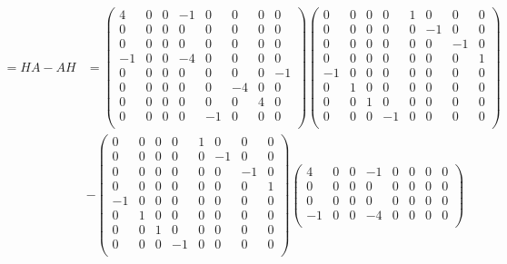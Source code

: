\begin{align*}
	[H,A] = HA-AH &=
	\begin{pmatrix}
4 & 0 & 0 & -1 & 0 & 0 & 0 & 0  \\
0 & 0 & 0 & 0 & 0 & 0 & 0 & 0  \\
0 & 0 & 0 & 0 & 0 & 0 & 0 & 0  \\
-1 & 0 & 0 & -4 & 0 & 0 & 0 & 0  \\
0 & 0 & 0 & 0 & 0 & 0 & 0 & -1  \\
0 & 0 & 0 & 0 & 0 & -4 & 0 & 0  \\
0 & 0 & 0 & 0 & 0 & 0 & 4 & 0  \\
0 & 0 & 0 & 0 & -1 & 0 & 0 & 0  \\
\end{pmatrix}
\begin{pmatrix}
0 & 0 & 0 & 0 & 1 & 0 & 0 & 0  \\
0 & 0 & 0 & 0 & 0 & -1 & 0 & 0  \\
0 & 0 & 0 & 0 & 0 & 0 & -1 & 0  \\
0 & 0 & 0 & 0 & 0 & 0 & 0 & 1  \\
-1 & 0 & 0 & 0 & 0 & 0 & 0 & 0  \\
0 & 1 & 0 & 0 & 0 & 0 & 0 & 0  \\
0 & 0 & 1 & 0 & 0 & 0 & 0 & 0  \\
0 & 0 & 0 & -1 & 0 & 0 & 0 & 0  \\
\end{pmatrix} \\ 
		      &- \begin{pmatrix}
0 & 0 & 0 & 0 & 1 & 0 & 0 & 0  \\
0 & 0 & 0 & 0 & 0 & -1 & 0 & 0  \\
0 & 0 & 0 & 0 & 0 & 0 & -1 & 0  \\
0 & 0 & 0 & 0 & 0 & 0 & 0 & 1  \\
-1 & 0 & 0 & 0 & 0 & 0 & 0 & 0  \\
0 & 1 & 0 & 0 & 0 & 0 & 0 & 0  \\
0 & 0 & 1 & 0 & 0 & 0 & 0 & 0  \\
0 & 0 & 0 & -1 & 0 & 0 & 0 & 0  \\
\end{pmatrix}
\begin{pmatrix}
4 & 0 & 0 & -1 & 0 & 0 & 0 & 0  \\
0 & 0 & 0 & 0 & 0 & 0 & 0 & 0  \\
0 & 0 & 0 & 0 & 0 & 0 & 0 & 0  \\
-1 & 0 & 0 & -4 & 0 & 0 & 0 & 0  \\

\end{pmatrix}
\end{align*}

